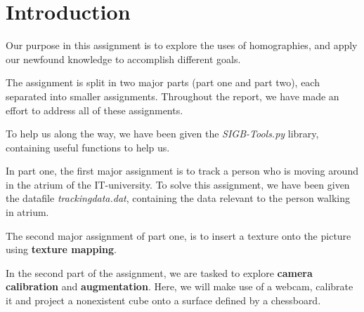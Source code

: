 \section{Introduction}
Our purpose in this assignment is to explore the uses of homographies, and apply our newfound knowledge to accomplish different goals.\newline

The assignment is split in two major parts (part one and part two), each separated into smaller assignments. Throughout the report, we have made an effort to address all of these assignments.\newline

To help us along the way, we have been given the \textsl{SIGB-Tools.py} library, containing useful functions to help us.\newline

In part one, the first major assignment is to track a person who is moving around in the atrium of the IT-university. To solve this assignment, we have been given the datafile \textsl{trackingdata.dat}, containing the data relevant to the person walking in atrium.\newline

The second major assignment of part one, is to insert a texture onto the picture using \textbf{texture mapping}.\newline

In the second part of the assignment, we are tasked to explore \textbf{camera calibration} and \textbf{augmentation}. Here, we will make use of a webcam, calibrate it and project a nonexistent cube onto a surface defined by a chessboard.